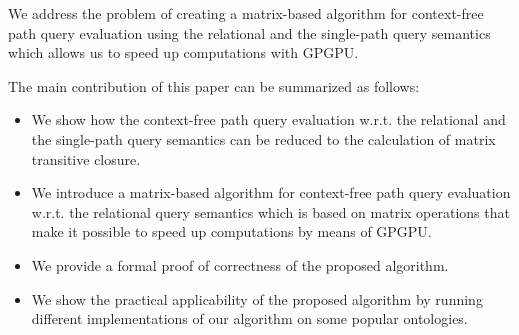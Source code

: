 We address the problem of creating a matrix-based algorithm for context-free path query evaluation using the relational and the single-path query semantics which allows us to speed up computations with GPGPU.

The main contribution of this paper can be summarized as follows:
\begin{itemize}
	\item We show how the context-free path query evaluation w.r.t. the relational and the single-path query semantics can be reduced to the calculation of matrix transitive closure.
	\item We introduce a matrix-based algorithm for context-free path query evaluation w.r.t. the relational query semantics which is based on matrix operations that make it possible to speed up computations by means of GPGPU.
	\item We provide a formal proof of correctness of the proposed algorithm.
	\item We show the practical applicability of the proposed algorithm by running different implementations of our algorithm on some popular ontologies.
\end{itemize}
